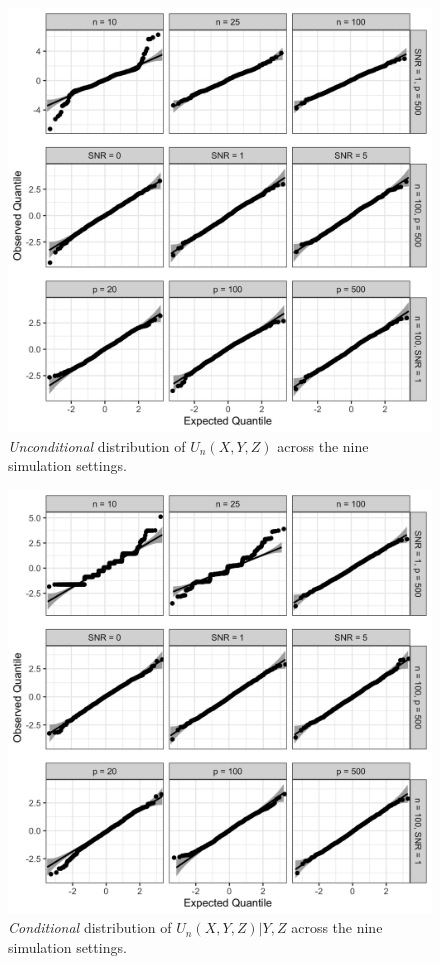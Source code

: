 \documentclass[12pt]{article}
\theoremstyle{definition}
\theoremstyle{remark}
\newcommand{\srx}{X}
\newcommand{\srz}{Z}
\newcommand{\sry}{Y}
\begin{document}
\begin{figure}[h!]
	\includegraphics[width = \textwidth]{unconditional.png}
	\caption{\emph{Unconditional} distribution of $U_n(\srx, \sry, \srz)$ across the nine simulation settings.}
	\label{fig:unconditional}
\end{figure}

\begin{figure}[h!]
	\includegraphics[width = \textwidth]{conditional.png}
	\caption{\emph{Conditional} distribution of $U_n(\srx, \sry, \srz)|\sry,\srz$ across the nine simulation settings.}
	\label{fig:conditional}
\end{figure}
\end{document}

